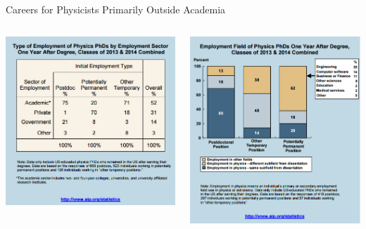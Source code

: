 \documentclass[xcolor=table,compress,professionalfonts,pdfpagelabels]{beamer}
\begin{document}
\begin{frame}{Careers for Physicists Primarily Outside Academia}
 \begin{columns}[t]
  \begin{column}{0.49\textwidth}
   \includegraphics[width=\textwidth]{phdinitemp1}
  \end{column}
  \begin{column}{0.49\textwidth}
   \includegraphics[width=\textwidth]{phdinitemp2}
  \end{column}
 \end{columns}
\end{frame}
\end{document}
